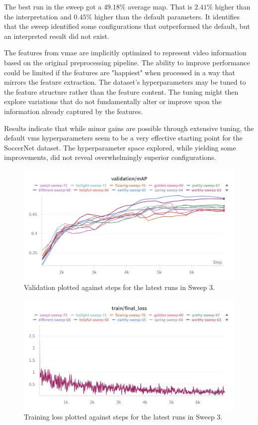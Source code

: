 The best run in the sweep got a $49.18\%$ average \acrshort{map}. That is $2.41\%$ higher than the interpretation and $0.45\%$ higher than the default parameters. It identifies that the sweep identified some configurations that outperformed the default, but an interpreted result did not exist. 

The features from \acrshort{vmae} are implicitly optimized to represent video information based on the original preprocessing pipeline. The ability to improve performance could be limited if the features are "happiest" when processed in a way that mirrors the feature extraction. The dataset's hyperparameters may be tuned to the feature structure rather than the feature content. The tuning might then explore variations that do not fundamentally alter or improve upon the information already captured by the features. 

Results indicate that while minor gains are possible through extensive tuning, the default \acrshort{vms} hyperparameters seem to be a very effective starting point for the SoccerNet dataset. The hyperparameter space explored, while yielding some improvements, did not reveal overwhelmingly superior configurations.

\begin{figure}
    \centering
    \includegraphics[width=0.75\linewidth]{figures/plateu_sweep.png}
    \caption{Validation plotted against steps for the latest runs in Sweep 3. }
    \label{fig:plateu_sweep}
\end{figure}
\begin{figure}
    \centering
    \includegraphics[width=0.75\linewidth]{figures/plateu_loss.png}
    \caption{Training loss plotted against steps for the latest runs in Sweep 3.}
    \label{fig:plateu_loss}
\end{figure}

